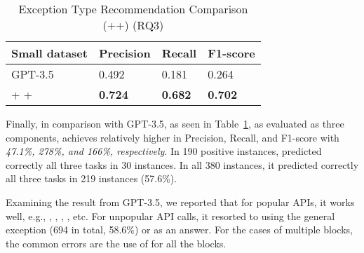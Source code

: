 \begin{table}[htpb]
  \caption{Exception Type Recommendation Comparison ({\xblock}+{\xstate}+{\xtype}) (RQ3)}
  \vspace{-12pt}
  \small
	\begin{center}
		\renewcommand{\arraystretch}{1}
		\begin{tabular}{| p{3.10cm}<{\centering} | p{1.2cm}<{\centering} | p{1.2cm}<{\centering}| p{1.2cm}<{\centering}|}
		  \hline
			Small dataset  & Precision  & Recall & F1-score \\
			\hline
                        GPT-3.5 & 0.492 & 0.181 & 0.264 \\
			\hline
			\xblock + \xstate  + \xtype  & \textbf{0.724}  &  \textbf{0.682} & \textbf{0.702}\\
			\hline
		\end{tabular}
		\label{tab:xtype-2}
	\end{center}

\end{table}

Finally, in comparison with GPT-3.5, as seen in
Table~\ref{tab:xtype-2}, {\tool} as evaluated as three components,
achieves relatively higher in Precision, Recall, and F1-score with
{\em 47.1\%, 278\%, and 166\%, respectively}. In 190 positive
instances, {\tool} predicted correctly all three tasks in 30
instances. In all 380 instances, it predicted correctly all
three tasks in 219 instances (57.6\%).

Examining the result from GPT-3.5, we reported that for popular APIs,
it works well, e.g., ,
, ,
, etc. For
unpopular API calls, it resorted to using the general exception
 (694 in total, 58.6\%) or 
as an answer. For the cases of multiple  blocks, the
common errors are the use of  for all the blocks.

